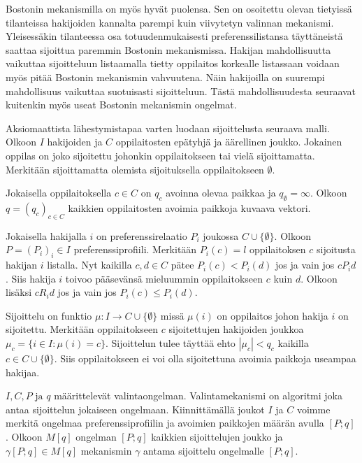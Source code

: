 \documentclass[gradu]{tktltiki}
\begin{document}
Bostonin mekanismilla on myös hyvät puolensa. Sen on osoitettu olevan
tietyissä tilanteissa hakijoiden kannalta parempi kuin viivytetyn
valinnan mekanismi. Yleisessäkin tilanteessa osa totuudenmukaisesti
preferenssilistansa täyttäneistä saattaa sijoittua paremmin Bostonin
mekanismissa. Hakijan mahdollisuutta vaikuttaa sijoitteluun
listaamalla tietty oppilaitos korkealle listassaan voidaan myös pitää
Bostonin mekanismin vahvuutena. Näin hakijoilla on suurempi
mahdollisuus vaikuttaa suotuisasti sijoitteluun. Tästä
mahdollisuudesta seuraavat kuitenkin myös useat Bostonin mekanismin
ongelmat.

Aksiomaattista lähestymistapaa varten luodaan sijoittelusta seuraava
malli. Olkoon \(I\) hakijoiden ja \(C\) oppilaitosten epätyhjä ja
äärellinen joukko. Jokainen oppilas on joko sijoitettu johonkin
oppilaitokseen tai vielä sijoittamatta. Merkitään sijoittamatta
olemista sijoituksella oppilaitokseen \(\emptyset\).

Jokaisella oppilaitoksella \(c \in C\) on \(q_c\) avoinna olevaa
paikkaa ja \(q_{\emptyset} = \infty\). Olkoon \(q = (q_c)_{c \in C}\)
kaikkien oppilaitosten avoimia paikkoja kuvaava vektori.

Jokaisella hakijalla \(i\) on preferenssirelaatio \(P_i\) joukossa \(C
\cup \{\emptyset\}\). Olkoon \(P = (P_i)_i \in I\)
preferenssiprofiili. Merkitään \(P_i(c) = l\) oppilaitoksen \(c\)
sijoitusta hakijan \(i\) listalla. Nyt kaikilla \(c, d \in C\) pätee
\(P_i(c) < P_i(d)\) jos ja vain jos \(cP_id\). Siis hakija \(i\)
toivoo pääsevänsä mieluummin oppilaitokseen \(c\) kuin \(d\). Olkoon
lisäksi \(cR_id\) jos ja vain jos \(P_i(c) \leq P_i(d)\).

Sijoittelu on funktio \(\mu : I \rightarrow C \cup \{\emptyset\}\)
missä \(\mu(i)\) on oppilaitos johon hakija \(i\) on sijoitettu.
Merkitään oppilaitokseen \(c\) sijoitettujen hakijoiden joukkoa
\(\mu_{c} = \{i \in I : \mu(i) = c\}\). Sijoittelun tulee
täyttää ehto \(|\mu_c| < q_c\) kaikilla \(c \in C \cup
\{\emptyset\}\). Siis oppilaitokseen ei voi olla sijoitettuna avoimia
paikkoja useampaa hakijaa.

\(I, C, P \text{ ja } q\) määrittelevät valintaongelman.
Valintamekanismi on algoritmi joka antaa sijoittelun jokaiseen
ongelmaan. Kiinnittämällä joukot \(I\) ja \(C\) voimme merkitä
ongelmaa preferenssiprofiilin ja avoimien paikkojen määrän avulla
\([P;q]\). Olkoon \(M[q]\) ongelman \([P;q]\) kaikkien sijoittelujen
joukko ja \(\gamma [P;q] \in M[q]\) mekanismin \(\gamma\) antama
sijoittelu ongelmalle \([P;q]\).
\end{document}
